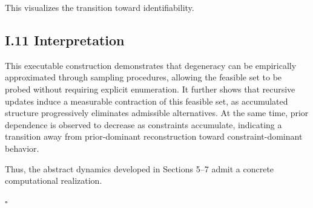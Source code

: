 \documentclass[12pt, oneside]{article}
\theoremstyle{plain}
\theoremstyle{definition}
\theoremstyle{remark}
\begin{document}
This visualizes the transition toward identifiability.

\subsection{I.11 Interpretation}

This executable construction demonstrates that degeneracy can be empirically approximated through sampling procedures, allowing the feasible set to be probed without requiring explicit enumeration. It further shows that recursive updates induce a measurable contraction of this feasible set, as accumulated structure progressively eliminates admissible alternatives. At the same time, prior dependence is observed to decrease as constraints accumulate, indicating a transition away from prior-dominant reconstruction toward constraint-dominant behavior. 

Thus, the abstract dynamics developed in Sections 5--7 admit a concrete computational realization.

\hfill $\square$
\end{document}
